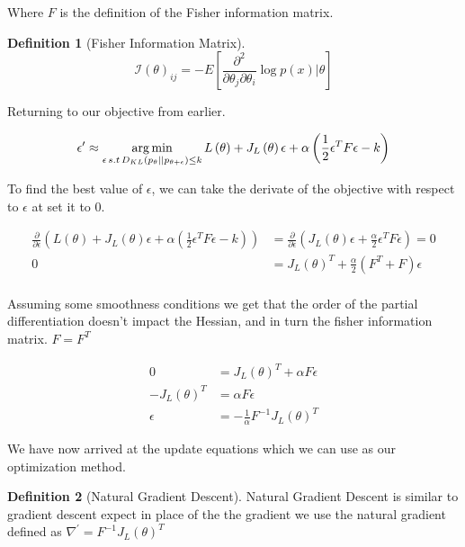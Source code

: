 \documentclass[12pt, a4paper]{report}
\theoremstyle{definition}
\theoremstyle{definition}
\newtheorem{definition}{Definition}[section]
\theoremstyle{definition}
\begin{document}
Where $F$ is the definition of the Fisher information matrix.


\begin{definition}[Fisher Information Matrix]
    $$\mathcal{I} \left( \theta\right)_{ij} = - E \left[ \frac{\partial^2}{\partial \theta_j  \partial \theta_i }  \log p \left(x  \right)\big| \theta \right]$$
\end{definition}

Returning to our objective from earlier.

\begin{align}
    \epsilon^\prime &\approx \operatorname*{arg\,min}_{\epsilon \, s.t \, D_{KL} \left(p_\theta || p_{\theta + \epsilon} \right) \leq k}  L\left( \theta \right) +  J_L \left( \theta\right) \epsilon  + \alpha \left( \frac{1}{2} \epsilon^T F \epsilon - k\right) \\
\end{align}

To find the best value of $\epsilon$, we can take the derivate of the objective with respect to $\epsilon$ at set it to $0$.


\begin{align}
   \frac{\partial}{\partial \epsilon} \left( L\left( \theta \right) + J_L \left( \theta\right) \epsilon + \alpha \left( \frac{1}{2} \epsilon^T F \epsilon - k\right) \right) &=  \frac{\partial}{\partial \epsilon} \left( J_L \left( \theta\right) \epsilon + \frac{\alpha}{2} \epsilon^T F \epsilon  \right) = 0\\
  0 &=  J_L \left( \theta\right)^T + \frac{\alpha}{2}  \left(F^T + F \right)\epsilon\\
\end{align}

Assuming some smoothness conditions we get that the order of the partial differentiation doesn't impact the Hessian, and in turn the fisher information matrix. $F = F^T$

\begin{align}
   0 &=  J_L \left( \theta\right)^T + \alpha F \epsilon\\
   - J_L \left( \theta\right)^T &=  \alpha F \epsilon\\
  \epsilon &=  - \frac{1}{\alpha} F^{-1} J_L \left( \theta\right) ^T
\end{align} 

We have now arrived at the update equations which we can use as our optimization method.


\begin{definition}[Natural Gradient Descent]
    Natural Gradient Descent is similar to gradient descent expect in place of the the gradient we use the natural gradient defined as $\nabla^{\prime} =  F^{-1} J_L \left( \theta \right)^T$
\end{definition}
\end{document}
